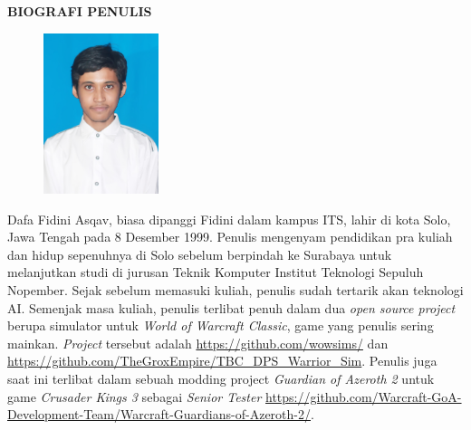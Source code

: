 \begin{center}
  \Large
  \textbf{BIOGRAFI PENULIS}
\end{center}


\vspace{2ex}

\begin{figure}
  \centering
  \vspace{-3ex}
  \includegraphics[width=0.3\textwidth]{gambar/portrait.JPG}
  \vspace{-4ex}
\end{figure}

Dafa Fidini Asqav, biasa dipanggi Fidini dalam kampus ITS, lahir di kota Solo, Jawa Tengah
pada 8 Desember 1999. Penulis mengenyam pendidikan pra kuliah dan hidup sepenuhnya di Solo
sebelum berpindah ke Surabaya untuk melanjutkan studi di jurusan Teknik Komputer Institut Teknologi
Sepuluh Nopember. Sejak sebelum memasuki kuliah, penulis sudah tertarik akan teknologi AI.
Semenjak masa kuliah, penulis terlibat penuh dalam dua \emph{open source project} berupa simulator
untuk \emph{World of Warcraft Classic}, game yang penulis sering mainkan. \emph{Project} tersebut adalah
\url{https://github.com/wowsims/} dan \url{https://github.com/TheGroxEmpire/TBC_DPS_Warrior_Sim}.
Penulis juga saat ini terlibat dalam sebuah modding project \emph{Guardian of Azeroth 2} untuk
game \emph{Crusader Kings 3} sebagai \emph{Senior Tester} \url{https://github.com/Warcraft-GoA-Development-Team/Warcraft-Guardians-of-Azeroth-2/}.